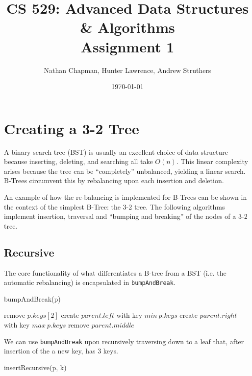 \documentclass{article}
\title{\vspace{-0.625in}CS 529: Advanced Data Structures \& Algorithms \\ Assignment 1}
\author{Nathan Chapman, Hunter Lawrence, Andrew Struthers}
\date{\today}
\begin{document}
\maketitle

\section*{Creating a 3-2 Tree}

    A binary search tree (BST) is usually an excellent choice of data structure because inserting, deleting, and searching all take $O(n)$.  This linear complexity arises because the tree can be ``completely'' unbalanced, yielding a linear search.  B-Trees circumvent this by rebalancing upon each insertion and deletion.

    An example of how the re-balancing is implemented for B-Trees can be shown in the context of the simplest B-Tree: the 3-2 tree.  The following algorithms implement insertion, traversal and ``bumping and breaking'' of the nodes of a 3-2 tree.

    \subsection*{Recursive}

        The core functionality of what differentiates a B-tree from a BST (i.e. the automatic rebalancing) is encapsulated in \texttt{bumpAndBreak}.

        \begin{function}
            \caption{bumpAndBreak(p)}
            \DontPrintSemicolon


            remove $p.keys[2]$\;
            create $parent.left$ with key $min \ p.keys$\;
            create $parent.right$ with key $max \ p.keys$\;
            remove $parent.middle$\;
        \end{function}

        We can use \texttt{bumpAndBreak} upon recursively traversing down to a leaf that, after insertion of the a new key, has 3 keys.

        \begin{function}
            \caption{insertRecursive(p, k)}
            \DontPrintSemicolon


        \end{function}
    
\end{document}
